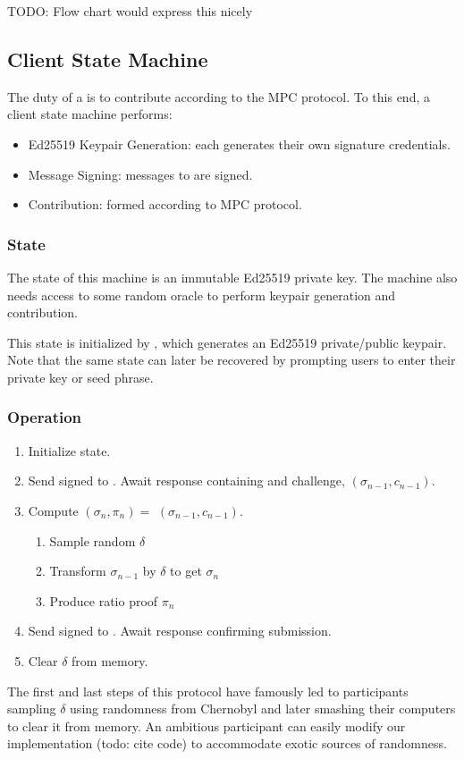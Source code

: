 TODO: Flow chart would express this nicely

\subsection{Client State Machine}

The duty of a \Contributor{} is to contribute according to the MPC protocol. To this end, a client state machine performs:
\begin{itemize}
    \item Ed25519 Keypair Generation: each \Contributor{} generates their own signature credentials.
    \item Message Signing: messages to \Coordinator{} are signed.
    \item Contribution: formed according to MPC protocol.
\end{itemize}

\subsubsection*{State}
The state of this machine is an immutable Ed25519 private key. The machine also needs access to some random oracle to perform keypair generation and contribution.

This state is initialized by \generatekeypair{}, which generates an Ed25519 private/public keypair. Note that the same state can later be recovered by prompting users to enter their private key or seed phrase.

\subsubsection*{Operation}

\begin{enumerate}
    \item Initialize state.
    \item Send signed \QueryRequest{} to \Coordinator{}. Await response containing \MpcState{} and challenge, $(\sigma_{n-1}, c_{n-1})$.
    \item Compute $(\sigma_n, \pi_n) = $ \contribute{}$(\sigma_{n-1}, c_{n-1})$.
    \begin{enumerate}
        \item Sample random $\delta$
        \item Transform $\sigma_{n-1}$ by $\delta$ to get $\sigma_n$
        \item Produce ratio proof $\pi_n$ 
    \end{enumerate}
    \item Send signed \UpdateRequest{} to \Coordinator{}. Await response confirming submission.
    \item Clear $\delta$ from memory.
\end{enumerate}

The first and last steps of this protocol have famously led to participants sampling $\delta$ using randomness from Chernobyl and later smashing their computers to clear it from memory. An ambitious participant can easily modify our implementation (todo: cite code) to accommodate exotic sources of randomness.